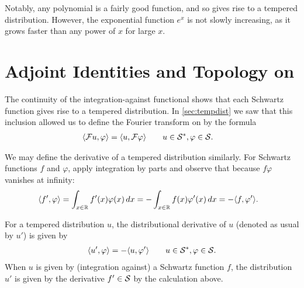   Notably, any polynomial is a fairly good function, and so gives rise to a tempered distribution.
  However, the exponential function $e^x$ is not slowly increasing, as it grows faster than any power of $x$ for large $x$.
%

  \section{Adjoint Identities and Topology on \SS}
    The continuity of the integration-against functional shows that each Schwartz function gives rise to a tempered distribution.
    In \cref{sec:tempdist} we saw that this inclusion allowed us to define the Fourier transform on \SS by the formula
    \begin{align*}
      \langle\F u, \varphi\rangle &= \langle u, \F\varphi\rangle
      \qquad u\in\SS, \varphi\in\S \text{.}
    \end{align*}
    
    We may define the derivative of a tempered distribution similarly.
    For Schwartz functions $f$ and $\varphi$, apply integration by parts and observe that because $f\varphi$ vanishes at infinity:
    \begin{align*}
      \langle f', \varphi\rangle
      &= \int_{x\in\R} f'(x)\varphi(x)\,dx
      = -\int_{x\in\R} f(x)\varphi'(x)\,dx
      = -\langle f,\varphi'\rangle\text{.}
    \end{align*}
    \begin{defn}
      For a tempered distribution $u$, the distributional derivative of $u$ (denoted as usual by $u'$) is given by
      \begin{align*}
        \langle u', \varphi\rangle = -\langle u, \varphi'\rangle
        \qquad u\in\SS,\varphi\in\S \text{.}
      \end{align*}
      When $u$ is given by (integration against) a Schwartz function $f$, the distribution $u'$ is given by the derivative $f'\in\S$ by the calculation above. 
    \end{defn}
    
